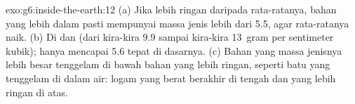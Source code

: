 \begin{solution}{exo:g6:inside-the-earth:12}
(a) Jika  lebih ringan daripada rata-ratanya, bahan yang lebih dalam
pasti mempunyai massa jenis lebih dari 5.5, agar rata-ratanya naik.
(b) Di  dan  (dari kira-kira 9.9 sampai kira-kira
13~gram per sentimeter kubik);  hanya mencapai 5.6 tepat di dasarnya.
(c) Bahan yang massa jenisnya lebih besar tenggelam di bawah bahan yang
lebih ringan, seperti batu yang tenggelam di dalam air: logam yang berat
berakhir di tengah dan  yang lebih ringan di atas.
\end{solution}

